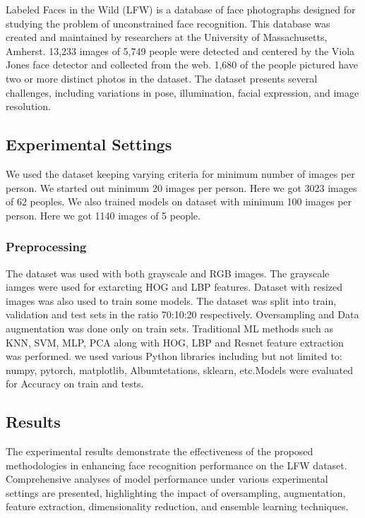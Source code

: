 \documentclass[a4paper]{article}
\theoremstyle{plain}
\theoremstyle{definition}
\begin{document}
Labeled Faces in the Wild (LFW) is a database of face photographs designed for studying the problem of unconstrained face recognition. This database was created and maintained by researchers at the University of Massachusetts, Amherst. 13,233 images of 5,749 people were detected and centered by the Viola Jones face detector and collected from the web. 1,680 of the people pictured have two or more distinct photos in the dataset. The dataset presents several challenges, including variations in pose, illumination, facial expression, and image resolution.

\subsection{Experimental Settings}

We used the dataset keeping varying criteria for minimum number of images per person. We started out minimum 20 images per person. Here we got 3023 images of 62 peoples. We also trained models on dataset with minimum 100 images per person. Here we got 1140 images of 5 people. 

\subsubsection{Preprocessing}

The dataset was used with both grayscale and RGB images. The grayscale iamges were used for extarcting HOG and LBP features. Dataset with resized images was also used to train some models. The dataset was split into train, validation and test sets in the ratio 70:10:20 respectively. Oversampling and Data augmentation was done only on train sets. Traditional ML methods such as KNN, SVM, MLP, PCA along with HOG, LBP and Resnet feature extraction was performed. we used various Python libraries including but not limited to: numpy, pytorch, matplotlib, Albumtetations, sklearn, etc.Models were evaluated for Accuracy on train and tests.

\subsection{Results}

The experimental results demonstrate the effectiveness of the proposed methodologies in enhancing face recognition performance on the LFW dataset. Comprehensive analyses of model performance under various experimental settings are presented, highlighting the impact of oversampling, augmentation, feature extraction, dimensionality reduction, and ensemble learning techniques.
\end{document}
